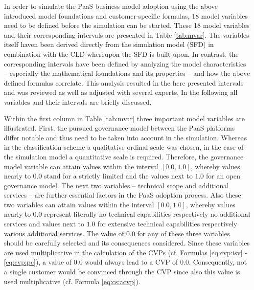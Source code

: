 In order to simulate the \ac{PaaS} business model adoption using the above introduced model foundations and customer-specific formulas, 18 model variables need to be defined before the simulation can be started. These 18 model variables and their corresponding intervals are presented in Table \ref{tab:mvar}. The variables itself haven been derived directly from the simulation model (\ac{SFD}) in combination with the \ac{CLD} whereupon the \ac{SFD} is built upon. In contrast, the corresponding intervals have been defined by analyzing the model characteristics -- especially the mathematical foundations and its properties -- and how the above defined formulas correlate. This analysis resulted in the here presented intervals and was reviewed as well as adjusted with several experts. In the following all variables and their intervals are briefly discussed.

Within the first column in Table \ref{tab:mvar} three important model variables are illustrated. First, the pursued governance model between the \ac{PaaS} platforms differ notable and thus need to be taken into account in the simulation. Whereas in the classification scheme a qualitative ordinal scale was chosen, in the case of the simulation model a quantitative scale is required. Therefore, the governance model variable can attain values within the interval $[0.0,1.0]$, whereby values nearly to $0.0$ stand for a strictly limited and the values next to $1.0$ for an open governance model. The next two variables -- technical scope and additional services -- are further essential factors in the \ac{PaaS} adoption process. Also these two variables can attain values within the interval $[0.0,1.0]$, whereby values nearly to $0.0$ represent literally no technical capabilities respectively no additional services and values next to $1.0$ for extensive technical capabilities respectively various additional services. The value of $0.0$ for any of these three variables should be carefully selected and its consequences considered. Since these variables are used multiplicative in the calculation of the \acp{CVP} (cf. Formulas \ref{eq:cvp:isv} - \ref{eq:cvp:pc}), a value of $0.0$ would always lead to a \ac{CVP} of $0.0$. Consequently, not a single customer would be convinced through the \ac{CVP} since also this value is used multiplicative (cf. Formula \ref{eq:cs:acvp}).

\newlength{\originalTabcolsep}
\setlength{\originalTabcolsep}{\tabcolsep}
\setlength{\tabcolsep}{1.5mm}

